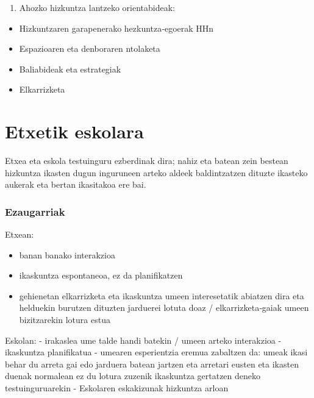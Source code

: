 \documentclass[
]{book}
\providecommand{\tightlist}{%
  \setlength{\itemsep}{0pt}\setlength{\parskip}{0pt}}
\begin{document}
\begin{enumerate}
\def\labelenumi{\arabic{enumi}.}
\setcounter{enumi}{2}
\tightlist
\item
  Ahozko hizkuntza lantzeko orientabideak:\\
\end{enumerate}

\begin{itemize}
\tightlist
\item
  Hizkuntzaren garapenerako hezkuntza‐egoerak HHn
\item
  Espazioaren eta denboraren ntolaketa
\item
  Baliabideak eta estrategiak
\item
  Elkarrizketa
\end{itemize}

\hypertarget{etxetik-eskolara}{%
\section{Etxetik eskolara}\label{etxetik-eskolara}}

Etxea eta eskola testuinguru ezberdinak dira; nahiz eta batean zein bestean hizkuntza ikasten dugun inguruneen arteko aldeek baldintzatzen dituzte ikasteko aukerak eta bertan ikasitakoa ere bai.

\hypertarget{ezaugarriak}{%
\subsubsection{Ezaugarriak}\label{ezaugarriak}}

Etxean:

\begin{itemize}
\tightlist
\item
  banan banako interakzioa
\item
  ikaskuntza espontaneoa, ez da planifikatzen
\item
  gehienetan elkarrizketa eta ikaskuntza umeen interesetatik abiatzen dira eta helduekin burutzen dituzten jarduerei lotuta doaz / elkarrizketa‐gaiak umeen bizitzarekin lotura estua
\end{itemize}

Eskolan:
- irakaslea ume talde handi batekin / umeen arteko interakzioa
- ikaskuntza planifikatua
- umearen esperientzia eremua zabaltzen da: umeak ikasi behar du arreta gai edo jarduera batean jartzen eta arretari eusten eta ikasten duenak normalean ez du lotura zuzenik ikaskuntza gertatzen deneko testuinguruarekin
- Eskolaren eskakizunak hizkuntza arloan
\end{document}

